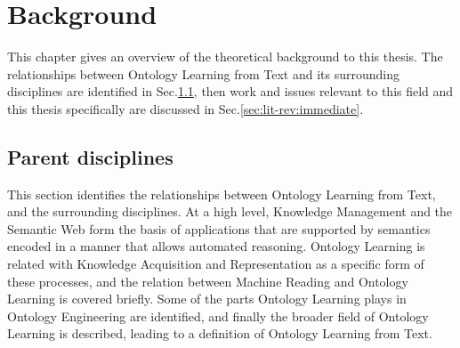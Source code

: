 \documentclass[a4paper]{report}
\begin{document}
\chapter{Background}

This chapter gives an overview of the theoretical background to this thesis.
The relationships between Ontology Learning from Text and its surrounding disciplines are identified in Sec.\ref{sec:lit-rev:parents}, then work and issues relevant to this field and this thesis specifically are discussed in Sec.\ref{sec:lit-rev:immediate}.

\section{Parent disciplines}
\label{sec:lit-rev:parents}

This section identifies the relationships between Ontology Learning from Text, and the surrounding disciplines.
At a high level, Knowledge Management and the Semantic Web form the basis of applications that are supported by semantics encoded in a manner that allows automated reasoning.
Ontology Learning is related with Knowledge Acquisition and Representation as a specific form of these processes, and the relation between Machine Reading and Ontology Learning is covered briefly.
Some of the parts Ontology Learning plays in Ontology Engineering are identified, and finally the broader field of Ontology Learning is described, leading to a definition of Ontology Learning from Text.
\end{document}
